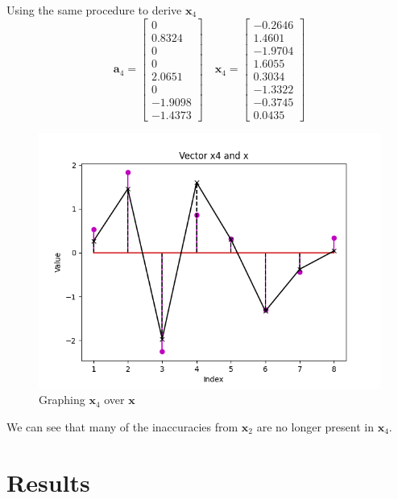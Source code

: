 \documentclass{article}
\newcommand{\bs}[1]{\boldsymbol{#1}}
\begin{document}
Using the same procedure to derive $\bs{x}_4$
$$
\bs{a}_4 = \begin{bmatrix} 0 \\ 0.8324 \\ 0 \\ 0 \\ 2.0651 \\ 0 \\ -1.9098 \\ -1.4373 \end{bmatrix} 
\quad
\bs{x}_4 = \begin{bmatrix} -0.2646 \\ 1.4601 \\ -1.9704 \\ 1.6055 \\ 0.3034 \\ -1.3322 \\ -0.3745 \\ 0.0435 \end{bmatrix}
$$

\begin{figure}[h!]
	\centering
	\includegraphics[scale=0.5]{CA_01Figure_5.png}
	\caption{Graphing $\bs{x}_4$ over $\bs{x}$} 
	\label{fig: FIG 05}
\end{figure}

We can see that many of the inaccuracies from $\bs{x}_2$ are no longer present in $\bs{x}_4$.

\section{Results}
\end{document}
